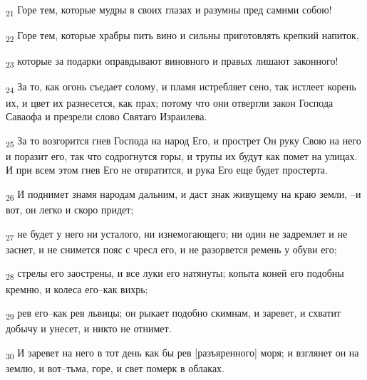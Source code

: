 \begin{tcolorbox}
\textsubscript{21} Горе тем, которые мудры в своих глазах и разумны пред самими собою!
\end{tcolorbox}
\begin{tcolorbox}
\textsubscript{22} Горе тем, которые храбры пить вино и сильны приготовлять крепкий напиток,
\end{tcolorbox}
\begin{tcolorbox}
\textsubscript{23} которые за подарки оправдывают виновного и правых лишают законного!
\end{tcolorbox}
\begin{tcolorbox}
\textsubscript{24} За то, как огонь съедает солому, и пламя истребляет сено, так истлеет корень их, и цвет их разнесется, как прах; потому что они отвергли закон Господа Саваофа и презрели слово Святаго Израилева.
\end{tcolorbox}
\begin{tcolorbox}
\textsubscript{25} За то возгорится гнев Господа на народ Его, и прострет Он руку Свою на него и поразит его, так что содрогнутся горы, и трупы их будут как помет на улицах. И при всем этом гнев Его не отвратится, и рука Его еще будет простерта.
\end{tcolorbox}
\begin{tcolorbox}
\textsubscript{26} И поднимет знамя народам дальним, и даст знак живущему на краю земли, --и вот, он легко и скоро придет;
\end{tcolorbox}
\begin{tcolorbox}
\textsubscript{27} не будет у него ни усталого, ни изнемогающего; ни один не задремлет и не заснет, и не снимется пояс с чресл его, и не разорвется ремень у обуви его;
\end{tcolorbox}
\begin{tcolorbox}
\textsubscript{28} стрелы его заострены, и все луки его натянуты; копыта коней его подобны кремню, и колеса его--как вихрь;
\end{tcolorbox}
\begin{tcolorbox}
\textsubscript{29} рев его--как рев львицы; он рыкает подобно скимнам, и заревет, и схватит добычу и унесет, и никто не отнимет.
\end{tcolorbox}
\begin{tcolorbox}
\textsubscript{30} И заревет на него в тот день как бы рев [разъяренного] моря; и взглянет он на землю, и вот--тьма, горе, и свет померк в облаках.
\end{tcolorbox}
